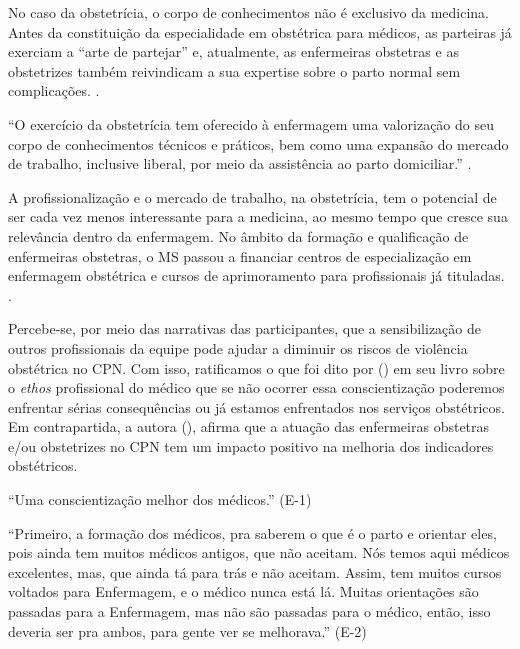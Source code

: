 No caso da obstetrícia, o corpo de conhecimentos não é exclusivo da medicina. Antes da constituição da especialidade em obstétrica para médicos, as parteiras já exerciam a ``arte de partejar'' e, atualmente, as enfermeiras obstetras e as obstetrizes também reivindicam a sua expertise sobre o parto normal sem complicações. \cite[p.69]{maia2010humanizaccao}.

\begin{citacao}
``O exercício da obstetrícia tem oferecido à enfermagem uma valorização do seu corpo de conhecimentos técnicos e práticos, bem como uma expansão do mercado de trabalho, inclusive liberal, por meio da assistência ao parto domiciliar.'' \cite[p.69]{maia2010humanizaccao}. 
\end{citacao}

A profissionalização e o mercado de trabalho, na obstetrícia, tem o potencial de ser cada vez menos interessante para a medicina, ao mesmo tempo que cresce sua relevância dentro da enfermagem. No âmbito da formação e qualificação de enfermeiras obstetras, o MS passou a financiar centros de especialização em enfermagem obstétrica e cursos de aprimoramento para profissionais já tituladas. \cite{maia2010humanizaccao,massari2017contribuiccoes}.

Percebe-se, por meio das narrativas das participantes, que a sensibilização de outros profissionais da equipe pode ajudar a diminuir os riscos de violência obstétrica no CPN. Com isso, ratificamos o que foi dito por \citeauthor{maia2010humanizaccao} (\citeyear{maia2010humanizaccao}) em seu livro sobre o \textit{ethos} profissional do médico que se não ocorrer essa conscientização poderemos enfrentar sérias consequências ou já estamos enfrentados nos serviços obstétricos. Em contrapartida, a autora \citeauthor{massari2017contribuiccoes} (\citeyear{massari2017contribuiccoes}), afirma que a atuação das enfermeiras obstetras e/ou obstetrizes no CPN tem um impacto positivo na melhoria dos indicadores obstétricos.

\begin{citacao}
``Uma conscientização melhor dos médicos.'' (E-1)
\end{citacao}

\begin{citacao}
``Primeiro, a formação dos médicos, pra saberem o que é o parto e orientar eles, pois ainda tem muitos médicos antigos, que não aceitam. Nós temos aqui médicos excelentes, mas, que ainda tá para trás e não aceitam. Assim, tem muitos cursos voltados para Enfermagem, e o médico nunca está lá. Muitas orientações são passadas para a Enfermagem, mas não são passadas para o médico, então, isso deveria ser pra ambos, para gente ver se melhorava.'' (E-2)
\end{citacao}

